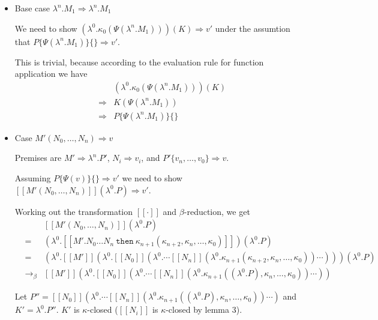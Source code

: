 \documentclass[a4paper,11pt]{article}
\begin{document}
\begin{itemize}
\item{Base case $\lambda^{n}.M_{1} \Rightarrow \lambda^{n}.M_{1}$}

  We need to show $(\lambda^{0}.\kappa_{0}(\Psi(\lambda^{n}.M_{1}))) (K)
  \Rightarrow v'$ under the assumtion that $P\{\Psi(\lambda^{n}.M_{1})\}\{\} \Rightarrow
  v'$.

  This is trivial, because according to the evaluation rule for
  function application we have
  \begin{eqnarray*}
   &             & (\lambda^{0}.\kappa_{0}(\Psi(\lambda^{n}.M_{1}))) (K) \\
   & \Rightarrow & K (\Psi(\lambda^{n}.M_{1})) \\
   & \Rightarrow & P\{\Psi(\lambda^{n}.M_{1})\}\{\}
  \end{eqnarray*}

\item{Case $M'(N_{0}, \ldots, N_{n}) \Rightarrow v$}

Premises are $M' \Rightarrow \lambda^{n}.P'$, $N_{i} \Rightarrow
v_{i}$, and $P'\{v_{n}, \ldots, v_{0}\} \Rightarrow v$.

Assuming $P\{\Psi(v)\}\{\} \Rightarrow v'$ we need to show
$[\![M'(N_{0}, \ldots, N_{n})]\!](\lambda^{0}.P) \Rightarrow v'$.

Working out the transformation $[\![\cdot]\!]$ and $\beta$-reduction,
we get
\begin{eqnarray*}
&   & [\![M'(N_{0}, \ldots, N_{n})]\!] (\lambda^{0}.P) \\
& = & (\lambda^{0}.[\![M'.N_{0} \ldots N_{n} \: \texttt{then} \: \kappa_{n+1}(\kappa_{n+2}, \kappa_{n}, \ldots, \kappa_{0})]\!]) (\lambda^{0}.P) \\
& = & (\lambda^{0}.[\![M']\!](\lambda^{0}.[\![N_{0}]\!](\lambda^{0}. \cdots [\![N_{n}]\!](\lambda^{0}.\kappa_{n+1}(\kappa_{n+2}, \kappa_{n}, \ldots, \kappa_{0})) \cdots ))) (\lambda^{0}.P) \\
& \rightarrow_{\beta} & [\![M']\!](\lambda^{0}.[\![N_{0}]\!](\lambda^{0}. \cdots [\![N_{n}]\!](\lambda^{0}.\kappa_{n+1}((\lambda^{0}.P), \kappa_{n}, \ldots, \kappa_{0})) \cdots ))
\end{eqnarray*}

Let $P'' = [\![N_{0}]\!](\lambda^{0}. \cdots [\![N_{n}]\!](\lambda^{0}.\kappa_{n+1}((\lambda^{0}.P), \kappa_{n}, \ldots, \kappa_{0})) \cdots )$ and $K' = \lambda^{0}.P''$. $K'$ is $\kappa$-closed ($[\![N_{i}]\!]$ is $\kappa$-closed by lemma 3).


\end{itemize}
\end{document}
